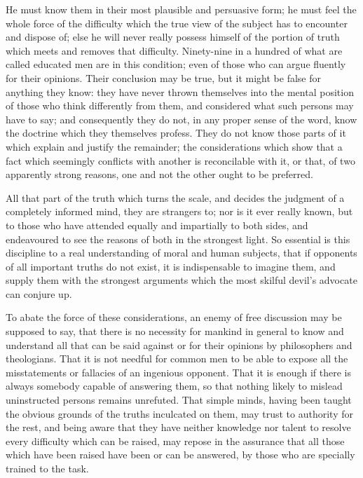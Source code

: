 He must know them in their most plausible and persuasive form; he must feel the whole force of the difficulty which the true view of the subject has to encounter and dispose of; else he will never really possess himself of the portion of truth which meets and removes that difficulty. Ninety-nine in a hundred of what are called educated men are in this condition; even of those who can argue fluently for their opinions. Their conclusion may be true, but it might be false for anything they know: they have never thrown themselves into the mental position of those who think differently from them, and considered what such persons may have to say; and consequently they do not, in any proper sense of the word, know the doctrine which they themselves profess. They do not know those parts of it which explain and justify the remainder; the considerations which show that a fact which seemingly conflicts with another is reconcilable with it, or that, of two apparently strong reasons, one and not the other ought to be preferred.\par

All that part of the truth which turns the scale, and decides the judgment of a completely informed mind, they are strangers to; nor is it ever really known, but to those who have attended equally and impartially to both sides, and endeavoured to see the reasons of both in the strongest light. So essential is this discipline to a real understanding of moral and human subjects, that if opponents of all important truths do not exist, it is indispensable to imagine them, and supply them with the strongest arguments which the most skilful devil’s advocate can conjure up.\par

To abate the force of these considerations, an enemy of free discussion may be supposed to say, that there is no necessity for mankind in general to know and understand all that can be said against or for their opinions by philosophers and theologians. That it is not needful for common men to be able to expose all the misstatements or fallacies of an ingenious opponent. That it is enough if there is always somebody capable of answering them, so that nothing likely to mislead uninstructed persons remains unrefuted. That simple minds, having been taught the obvious grounds of the truths inculcated on them, may trust to authority for the rest, and being aware that they have neither knowledge nor talent to resolve every difficulty which can be raised, may repose in the assurance that all those which have been raised have been or can be answered, by those who are specially trained to the task.\par

